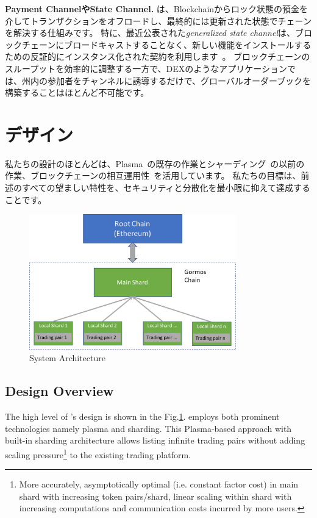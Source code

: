 \textbf{Payment ChannelやState Channel.}\cite{lightning, miller2017sprites} は、Blockchainからロック状態の預金を介してトランザクションをオフロードし、最終的には更新された状態でチェーンを解決する仕組みです。 特に、最近公表された\textit{generalized state channel}は、ブロックチェーンにブロードキャストすることなく、新しい機能をインストールするための反証的にインスタンス化された契約を利用します~\cite{Coleman2018, Dziembowski2018}。 ブロックチェーンのスループットを効率的に調整する一方で、DEXのようなアプリケーションでは、州内の参加者をチャンネルに誘導するだけで、グローバルオーダーブックを構築することはほとんど不可能です。


\section{デザイン}

私たちの設計のほとんどは、Plasma~\cite{plasma}の既存の作業とシャーディング~\cite{elastico}の以前の作業、ブロックチェーンの相互運用性~\cite{peacerelay}を活用しています。 私たちの目標は、前述のすべての望ましい特性を、セキュリティと分散化を最小限に抑えて達成することです。


\begin{figure}[t]
  \centering
  \includegraphics[width=0.8\textwidth]{images//architecture}
  \caption{\codename System Architecture}
  \label{architecture}
\end{figure}


\subsection{Design Overview}
The high level of \codename's design is shown in the Fig.\ref{architecture}. \codename employs both prominent technologies namely plasma and sharding. This Plasma-based approach with built-in sharding architecture allows listing infinite trading pairs without adding scaling pressure\footnote{More accurately, asymptotically optimal (i.e. constant factor cost) in main shard with increasing token pairs/shard, linear scaling within shard with increasing computations and communication costs incurred by more users.} to the existing trading platform.

